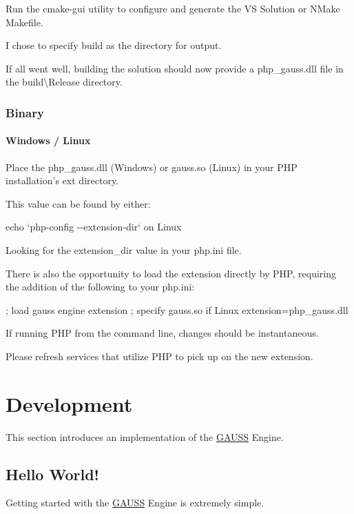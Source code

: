 Run the {\ttfamily cmake-\/gui} utility to configure and generate the V\-S Solution or N\-Make Makefile.

I chose to specify {\ttfamily build} as the directory for output.

If all went well, building the solution should now provide a {\ttfamily php\-\_\-gauss.\-dll} file in the {\ttfamily build\textbackslash{}Release} directory.\hypertarget{index_php_install_binary}{}\subsubsection{Binary}\label{index_php_install_binary}
\paragraph*{Windows / Linux}

Place the {\ttfamily php\-\_\-gauss.\-dll} (Windows) or {\ttfamily gauss.\-so} (Linux) in your P\-H\-P installation's {\ttfamily ext} directory.

This value can be found by either\-:


\begin{DoxyEnumerate}
\item {\ttfamily echo `php-\/config -\/-\/extension-\/dir`} on Linux
\item Looking for the {\ttfamily extension\-\_\-dir} value in your {\ttfamily php.\-ini} file.
\end{DoxyEnumerate}

There is also the opportunity to load the extension directly by P\-H\-P, requiring the addition of the following to your {\ttfamily php.\-ini}\-: \begin{DoxyVerb}; load gauss engine extension
; specify gauss.so if Linux
extension=php_gauss.dll
\end{DoxyVerb}


If running P\-H\-P from the command line, changes should be instantaneous.

Please refresh services that utilize P\-H\-P to pick up on the new extension.\hypertarget{index_example_apps}{}\section{Development}\label{index_example_apps}
This section introduces an implementation of the \hyperlink{class_g_a_u_s_s}{G\-A\-U\-S\-S} Engine.\hypertarget{index_hello_world}{}\subsection{Hello World!}\label{index_hello_world}
Getting started with the \hyperlink{class_g_a_u_s_s}{G\-A\-U\-S\-S} Engine is extremely simple.

